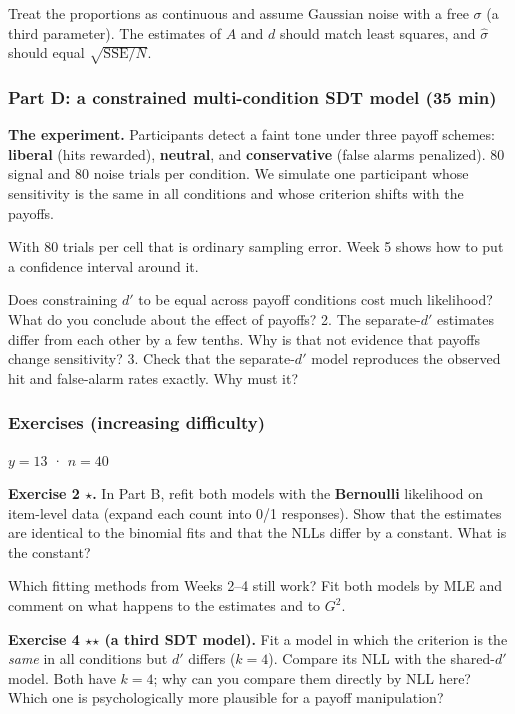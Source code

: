 Treat the proportions as continuous and assume Gaussian noise with a
free \(\sigma\) (a third parameter). The estimates of \(A\) and \(d\)
should match least squares, and \(\hat\sigma\) should equal
\(\sqrt{\mathrm{SSE}/N}\).

\subsubsection{Part D: a constrained multi-condition SDT model (35 min)}

\textbf{The experiment.} Participants detect a faint tone under three
payoff schemes: \textbf{liberal} (hits rewarded), \textbf{neutral}, and
\textbf{conservative} (false alarms penalized). 80 signal and 80 noise
trials per condition. We simulate one participant whose sensitivity is
the same in all conditions and whose criterion shifts with the payoffs.

With 80 trials per cell that is ordinary sampling error. Week 5 shows
how to put a confidence interval around it.

Does constraining \(d'\) to be equal across payoff conditions cost much
likelihood? What do you conclude about the effect of payoffs? 2. The
separate-\(d'\) estimates differ from each other by a few tenths. Why is
that not evidence that payoffs change sensitivity? 3. Check that the
separate-\(d'\) model reproduces the observed hit and false-alarm rates
exactly. Why must it?

\subsubsection{Exercises (increasing difficulty)}

\(y = 13\) · \(n = 40\)

\textbf{Exercise 2 \ensuremath{\star}.} In Part B, refit both models with the
\textbf{Bernoulli} likelihood on item-level data (expand each count into
0/1 responses). Show that the estimates are identical to the binomial
fits and that the NLLs differ by a constant. What is the constant?

Which fitting methods from Weeks 2--4 still work? Fit both models by MLE
and comment on what happens to the estimates and to \(G^2\).

\textbf{Exercise 4 \ensuremath{\star}\ensuremath{\star} (a third SDT model).} Fit a model in which the
criterion is the \emph{same} in all conditions but \(d'\) differs
(\(k = 4\)). Compare its NLL with the shared-\(d'\) model. Both have
\(k = 4\); why can you compare them directly by NLL here? Which one is
psychologically more plausible for a payoff manipulation?


